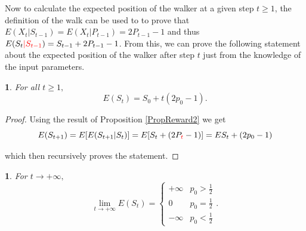 \documentclass{amsart}
\theoremstyle{definition}
\theoremstyle{plain}
\newtheorem{prop}[thm]{\protect\propositionname}
\theoremstyle{plain}
\newtheorem{cor}[thm]{\protect\corollaryname}
\theoremstyle{plain}
\numberwithin{equation}{section}
\providecommand{\corollaryname}{Corollary}
\providecommand{\propositionname}{Proposition}
\begin{document}
Now to calculate the expected position of the walker at a given
step $t\geq1$, {\color{red} the definition of the walk can be used to to prove that $E(X_{t}|S_{t-1})=E(X_{t}|P_{t-1}) = 2P_{t-1}-1$ and thus}
$E(S_{t}{\color{red}|S_{t-1}})=S_{t-1}+2P_{t-1}-1$. From this, we can prove the
following statement about the expected position of the walker
after step $t$ just from the knowledge of the input parameters.

\begin{prop}
For all $t\geq1,$
\[
E(S_{t})=S_{0}+t(2p_{0}-1).
\]
\end{prop}
\begin{proof}
Using the result of Proposition \ref{PropReward2} we get
\[
E(S_{t+1})=E[E(S_{t+1}|S_{t})]=E[S_{t}+(2P_{ \color{red}t}-1)]=
ES_{t}+(2p_{0}-1)
\]

which then recursively proves the statement.
\end{proof}

\begin{cor}
For $t\rightarrow+\infty,$ \textup{
\[
\lim_{t\to+\infty}E(S_{t})=\begin{cases}
+\infty & p_{0}>\frac{1}{2}\\
0 & p_{0}=\frac{1}{2}\\
-\infty & p_{0}<\frac{1}{2}
\end{cases}.
\]
}
\end{cor}
\end{document}
